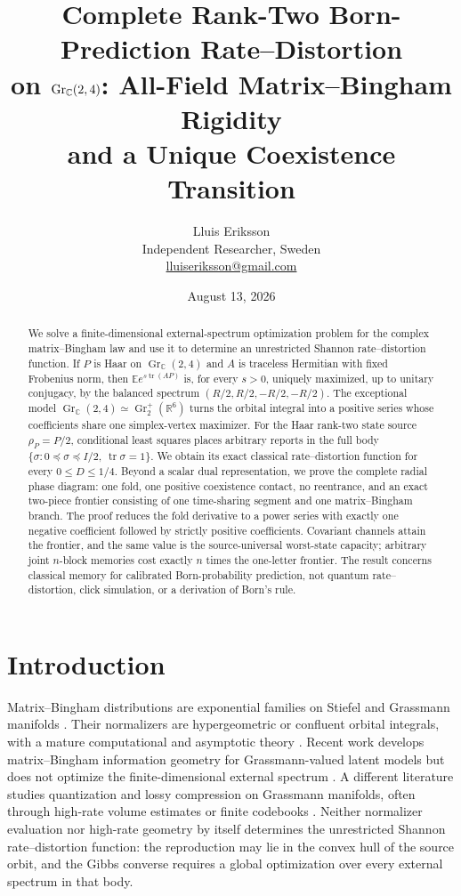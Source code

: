 \documentclass[11pt,a4paper]{article}
\title{\textbf{Complete Rank-Two Born-Prediction Rate--Distortion\\
on $\Gr(2,4)$: All-Field Matrix--Bingham Rigidity\\
and a Unique Coexistence Transition}}
\author{Lluis Eriksson\\\small Independent Researcher, Sweden\\
\small \href{mailto:lluiseriksson@gmail.com}{lluiseriksson@gmail.com}}
\date{August 13, 2026}
\newcommand{\Gr}{\operatorname{Gr}_{\mathbb C}}
\newcommand{\tr}{\operatorname{tr}}
\newcommand{\E}{\mathbb E}
\begin{document}
\maketitle

\begin{abstract}
We solve a finite-dimensional external-spectrum optimization problem for the complex matrix--Bingham law and use it to determine an unrestricted Shannon rate--distortion function.  If $P$ is Haar on $\Gr(2,4)$ and $A$ is traceless Hermitian with fixed Frobenius norm, then $\E e^{s\tr(AP)}$ is, for every $s>0$, uniquely maximized, up to unitary conjugacy, by the balanced spectrum $(R/2,R/2,-R/2,-R/2)$.  The exceptional model $\Gr(2,4)\simeq\operatorname{Gr}_2^+(\mathbb R^6)$ turns the orbital integral into a positive series whose coefficients share one simplex-vertex maximizer.  For the Haar rank-two state source $\rho_P=P/2$, conditional least squares places arbitrary reports in the full body $\{\sigma:0\preceq\sigma\preceq I/2,\ \tr\sigma=1\}$.  We obtain its exact classical rate--distortion function for every $0\le D\le1/4$.  Beyond a scalar dual representation, we prove the complete radial phase diagram: one fold, one positive coexistence contact, no reentrance, and an exact two-piece frontier consisting of one time-sharing segment and one matrix--Bingham branch.  The proof reduces the fold derivative to a power series with exactly one negative coefficient followed by strictly positive coefficients.  Covariant channels attain the frontier, and the same value is the source-universal worst-state capacity; arbitrary joint $n$-block memories cost exactly $n$ times the one-letter frontier.  The result concerns classical memory for calibrated Born-probability prediction, not quantum rate--distortion, click simulation, or a derivation of Born's rule.
\end{abstract}

\section{Introduction}

Matrix--Bingham distributions are exponential families on Stiefel and Grassmann manifolds \cite{Kent1994,AliGaoAntolovich2019}.  Their normalizers are hypergeometric or confluent orbital integrals, with a mature computational and asymptotic theory \cite{James1964,ItzyksonZuber1980,BagyanRichards2024,LeakeMcSwiggenVishnoi2025}.  Recent work develops matrix--Bingham information geometry for Grassmann-valued latent models but does not optimize the finite-dimensional external spectrum \cite{CazzellaEtAl2026}.  A different literature studies quantization and lossy compression on Grassmann manifolds, often through high-rate volume estimates or finite codebooks \cite{DaiLiuRider2008,PitavalEtAl2016,RieglerKolianderBolcskei2023}.  Neither normalizer evaluation nor high-rate geometry by itself determines the unrestricted Shannon rate--distortion function: the reproduction may lie in the convex hull of the source orbit, and the Gibbs converse requires a global optimization over every external spectrum in that body.
\end{document}
